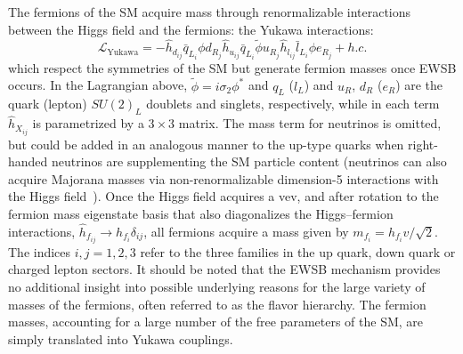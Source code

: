 The fermions of the SM acquire mass through renormalizable interactions between the Higgs field and the fermions: the Yukawa interactions:
\begin{equation}
    \mathcal{L}_\text{Yukawa} = -\hat{h}_{d_{ij}} \bar{q}_{L_i}\phi d_{R_j} \hat{h}_{u_{ij}} \bar{q}_{L_i}\tilde{\phi} u_{R_j} \hat{h}_{l_{ij}} \bar{l}_{L_i}\phi e_{R_j} + h.c.
\end{equation}
which respect the symmetries of the SM but generate fermion masses once EWSB occurs.
In the Lagrangian above, $\tilde{\phi} = i\sigma_2\phi^*$ and $q_L$ ($l_L$) and $u_R$, $d_R$ ($e_R$) are the quark (lepton) $SU(2)_L$ doublets and singlets, respectively, while in each term $\hat{h}_{X_{ij}}$ is parametrized by a $3\times3$ matrix.
The mass term for neutrinos is omitted, but could be added in an analogous manner to the up-type quarks when right-handed neutrinos are supplementing the SM particle content (neutrinos can also acquire Majorana masses via non-renormalizable dimension-5 interactions with the Higgs field~\cite{Weinberg:1979sa}).
Once the Higgs field acquires a vev, and after rotation to the fermion mass eigenstate basis that also diagonalizes the Higgs--fermion interactions, $\hat{h}_{f_{ij}} \rightarrow h_{f_i} \delta_{ij}$, all fermions acquire a mass given by $m_{f_i} = h_{f_{i}} v/\sqrt{2}$.
The indices $i,j = 1,2,3$ refer to the three families in the up quark, down quark or charged lepton sectors.
It should be noted that the EWSB mechanism provides no additional insight into possible underlying reasons for the large variety of masses of the fermions, often referred to as the flavor hierarchy.
The fermion masses, accounting for a large number of the free parameters of the SM, are simply translated into Yukawa couplings.

